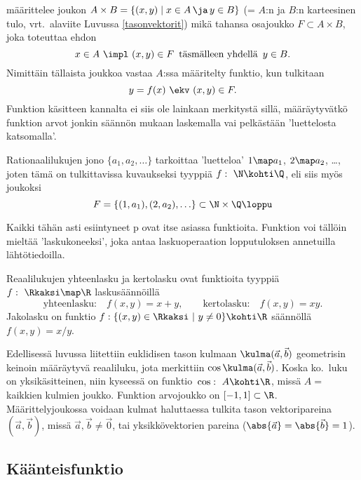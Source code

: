 määrittelee joukon $A \times B = \{(x,y) \mid x \in A\, \ja\, y \in B\}$ (= $A$:n ja $B$:n
karteesinen tulo, vrt.\ alaviite Luvussa \ref{tasonvektorit}) mikä tahansa osajoukko
$F \subset A \times B$, joka toteuttaa ehdon
\[
x \in A \ \impl \ (x,y) \in F\,\ \text{täsmälleen yhdellä}\,\ y \in B.
\]
Nimittäin tällaista joukkoa vastaa $A$:ssa määritelty funktio, kun tulkitaan
\[
y=f(x)\ \ekv\ (x,y) \in F.
\]
Funktion käsitteen kannalta ei siis ole lainkaan merkitystä sillä, määräytyvätkö funktion arvot
jonkin säännön mukaan laskemalla vai pelkästään 'luettelosta katsomalla'. 
\begin{Exa} Rationaalilukujen jono $\{a_1, a_2, \ldots\}$ tarkoittaa 'luetteloa' $1 \map a_1$, 
$2 \map a_2$, \ldots, joten tämä on tulkittavissa kuvaukseksi tyyppiä $f: \ \N \kohti \Q$, eli 
siis myös joukoksi
\[
F= \{ (1,a_1), (2,a_2),\ldots \} \subset \N \times \Q \loppu
\]
\end{Exa}
Kaikki tähän asti esiintyneet p ovat itse asiassa funktioita. 
Funktion voi tällöin mieltää 'laskukoneeksi', joka antaa laskuoperaation lopputuloksen
annetuilla lähtötiedoilla.
\begin{Exa}
Reaalilukujen yhteenlasku ja kertolasku ovat funktioita tyyppiä $f:\ \Rkaksi \map \R$ 
laskusäännöillä
\[
\text{yhteenlasku:} \quad f(x,y)=x+y, \qquad \text{kertolasku:} \quad f(x,y)=xy.
\]
Jakolasku on funktio $f: \{(x,y) \in \Rkaksi \ | \ y \neq 0 \} \kohti \R$ säännöllä
$f(x,y)=x/y$. \loppu
\end{Exa}
\begin{Exa} \label{skalaaritulo funktiona} Edellisessä luvussa liitettiin euklidisen tason
kulmaan $\kulma(\vec a,\vec b)$ geometrisin keinoin määräytyvä reaaliluku, jota merkittiin 
$\cos\kulma(\vec a,\vec b)$. Koska ko.\ luku on yksikäsitteinen, niin kyseessä on funktio 
$\,\cos:\ A \kohti \R$, missä $A=$ kaikkien kulmien joukko. Funktion arvojoukko on 
$[-1,1]\subset\R$. Määrittelyjoukossa voidaan kulmat haluttaessa tulkita tason vektoripareina
$(\vec a,\vec b)$, missä $\vec a,\vec b \neq \vec 0$, tai yksikkövektorien pareina 
($\abs{\vec a}=\abs{\vec b}=1$).  \loppu
\end{Exa}

\subsection{Käänteisfunktio}

